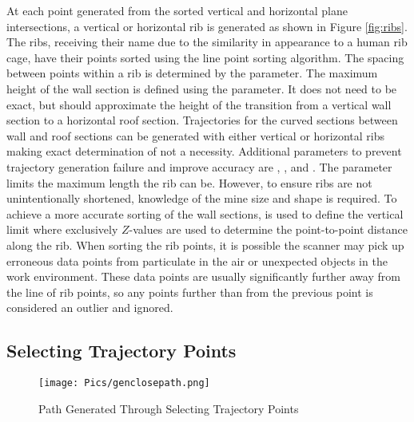 At each point generated from the sorted vertical and horizontal plane intersections, a vertical or horizontal rib is generated as shown in Figure \ref{fig:ribs}. The ribs, receiving their name due to the similarity in appearance to a human rib cage, have their points sorted using the line point sorting algorithm. The spacing between points within a rib is determined by the  parameter. The maximum height of the wall section is defined using the  parameter. It does not need to be exact, but should approximate the height of the transition from a vertical wall section to a horizontal roof section. Trajectories for the curved sections between wall and roof sections can be generated with either vertical or horizontal ribs making exact determination of  not a necessity. Additional parameters to prevent trajectory generation failure and improve accuracy are , , and . The parameter  limits the maximum length the rib can be. However, to ensure ribs are not unintentionally shortened, knowledge of the mine size and shape is required. To achieve a more accurate sorting of the wall sections,  is used to define the vertical limit where exclusively $Z$-values are used to determine the point-to-point distance along the rib. When sorting the rib points, it is possible the scanner may pick up erroneous data points from particulate in the air or unexpected objects in the work environment. These data points are usually significantly further away from the line of rib points, so any points further than  from the previous point is considered an outlier and ignored.\\

\subsection{Selecting Trajectory Points}
\begin{figure}[H]
    \centering
    \texttt{[image: Pics/genclosepath.png]}
    \caption{Path Generated Through Selecting Trajectory Points}
    \label{fig:path}
\end{figure}

